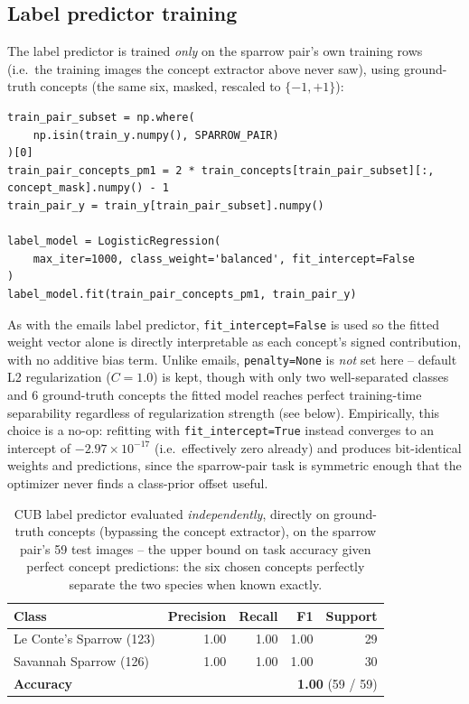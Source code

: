 \documentclass[11pt]{article}
\newcommand{\code}[1]{\texttt{#1}}
\begin{document}
\subsection{Label predictor training}

The label predictor is trained \emph{only} on the sparrow pair's own
training rows (i.e.\ the training images the concept extractor above never
saw), using ground-truth concepts (the same six, masked, rescaled to
$\{-1,+1\}$):

\begin{lstlisting}
train_pair_subset = np.where(
    np.isin(train_y.numpy(), SPARROW_PAIR)
)[0]
train_pair_concepts_pm1 = 2 * train_concepts[train_pair_subset][:, concept_mask].numpy() - 1
train_pair_y = train_y[train_pair_subset].numpy()

label_model = LogisticRegression(
    max_iter=1000, class_weight='balanced', fit_intercept=False
)
label_model.fit(train_pair_concepts_pm1, train_pair_y)
\end{lstlisting}

As with the emails label predictor, \code{fit\_intercept=False} is used so
the fitted weight vector alone is directly interpretable as each concept's
signed contribution, with no additive bias term. Unlike emails,
\code{penalty=None} is \emph{not} set here -- default L2 regularization
($C=1.0$) is kept, though with only two well-separated classes and 6
ground-truth concepts the fitted model reaches perfect training-time
separability regardless of regularization strength (see below).
Empirically, this choice is a no-op: refitting with \code{fit\_intercept=True}
instead converges to an intercept of $-2.97\times10^{-17}$ (i.e.\ effectively
zero already) and produces bit-identical weights and predictions, since the
sparrow-pair task is symmetric enough that the optimizer never finds a
class-prior offset useful.

\begin{table}[h]
\centering
\begin{tabular}{lrrrr}
\toprule
Class & Precision & Recall & F1 & Support \\
\midrule
Le Conte's Sparrow (123) & 1.00 & 1.00 & 1.00 & 29 \\
Savannah Sparrow (126)   & 1.00 & 1.00 & 1.00 & 30 \\
\midrule
\textbf{Accuracy} & \multicolumn{4}{r}{\textbf{1.00} (59 / 59)} \\
\bottomrule
\end{tabular}
\caption{CUB label predictor evaluated \emph{independently}, directly on
ground-truth concepts (bypassing the concept extractor), on the sparrow
pair's 59 test images -- the upper bound on task accuracy given perfect
concept predictions: the six chosen concepts perfectly separate the two
species when known exactly.}
\end{table}
\end{document}
